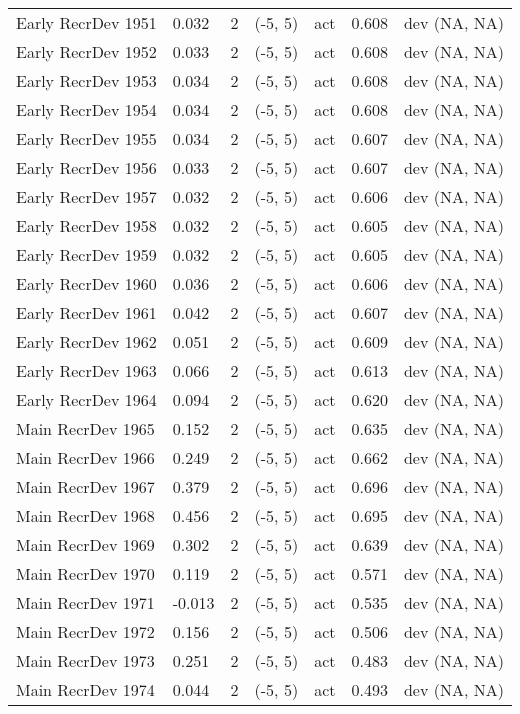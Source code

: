 \documentclass[11pt,
  english,
  letterpaper,
]{article}
\begin{document}
\begin{landscape}
\begin{longtable}[t]{>{\raggedright\arraybackslash}p{7.5cm}lllll>{\raggedright\arraybackslash}p{3.5cm}}
Early RecrDev 1951 & 0.032 & 2 & (-5, 5) & act & 0.608 & dev (NA, NA)\\
Early RecrDev 1952 & 0.033 & 2 & (-5, 5) & act & 0.608 & dev (NA, NA)\\
Early RecrDev 1953 & 0.034 & 2 & (-5, 5) & act & 0.608 & dev (NA, NA)\\
Early RecrDev 1954 & 0.034 & 2 & (-5, 5) & act & 0.608 & dev (NA, NA)\\
Early RecrDev 1955 & 0.034 & 2 & (-5, 5) & act & 0.607 & dev (NA, NA)\\
Early RecrDev 1956 & 0.033 & 2 & (-5, 5) & act & 0.607 & dev (NA, NA)\\
Early RecrDev 1957 & 0.032 & 2 & (-5, 5) & act & 0.606 & dev (NA, NA)\\
Early RecrDev 1958 & 0.032 & 2 & (-5, 5) & act & 0.605 & dev (NA, NA)\\
Early RecrDev 1959 & 0.032 & 2 & (-5, 5) & act & 0.605 & dev (NA, NA)\\
Early RecrDev 1960 & 0.036 & 2 & (-5, 5) & act & 0.606 & dev (NA, NA)\\
Early RecrDev 1961 & 0.042 & 2 & (-5, 5) & act & 0.607 & dev (NA, NA)\\
Early RecrDev 1962 & 0.051 & 2 & (-5, 5) & act & 0.609 & dev (NA, NA)\\
Early RecrDev 1963 & 0.066 & 2 & (-5, 5) & act & 0.613 & dev (NA, NA)\\
Early RecrDev 1964 & 0.094 & 2 & (-5, 5) & act & 0.620 & dev (NA, NA)\\
Main RecrDev 1965 & 0.152 & 2 & (-5, 5) & act & 0.635 & dev (NA, NA)\\
Main RecrDev 1966 & 0.249 & 2 & (-5, 5) & act & 0.662 & dev (NA, NA)\\
Main RecrDev 1967 & 0.379 & 2 & (-5, 5) & act & 0.696 & dev (NA, NA)\\
Main RecrDev 1968 & 0.456 & 2 & (-5, 5) & act & 0.695 & dev (NA, NA)\\
Main RecrDev 1969 & 0.302 & 2 & (-5, 5) & act & 0.639 & dev (NA, NA)\\
Main RecrDev 1970 & 0.119 & 2 & (-5, 5) & act & 0.571 & dev (NA, NA)\\
Main RecrDev 1971 & -0.013 & 2 & (-5, 5) & act & 0.535 & dev (NA, NA)\\
Main RecrDev 1972 & 0.156 & 2 & (-5, 5) & act & 0.506 & dev (NA, NA)\\
Main RecrDev 1973 & 0.251 & 2 & (-5, 5) & act & 0.483 & dev (NA, NA)\\
Main RecrDev 1974 & 0.044 & 2 & (-5, 5) & act & 0.493 & dev (NA, NA)\\

\end{longtable}
\end{landscape}
\end{document}
